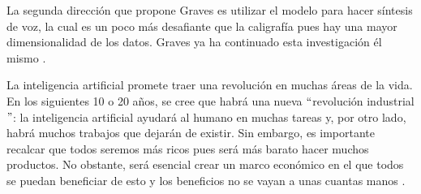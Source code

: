 \vspace{1em}

La segunda dirección que propone Graves es utilizar el modelo para hacer síntesis de voz, la cual es un poco más desafiante que la caligrafía pues hay una mayor dimensionalidad de los datos. Graves ya ha continuado esta investigación él mismo \cite{DBLP:journals/corr/Graves13}.

\vspace{1em}

La inteligencia artificial promete traer una revolución en muchas áreas de la vida. En los siguientes 10 o 20 años, se cree que habrá una nueva $``$revolución industrial$"$: la inteligencia artificial ayudará al humano en muchas tareas y, por otro lado, habrá muchos trabajos que dejarán de existir. Sin embargo, es importante recalcar que todos seremos más ricos pues será más barato hacer muchos productos. No obstante, será esencial crear un marco económico en el que todos se puedan beneficiar de esto y los beneficios no se vayan a unas cuantas manos \cite{goodfellow-et-al-2016}.


